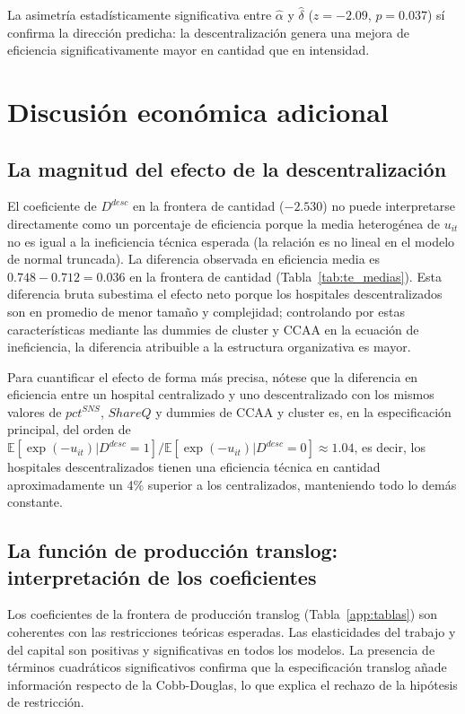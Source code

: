 \documentclass[12pt, a4paper, twoside, openright]{book}
\newcommand{\E}{\mathbb{E}}
\theoremstyle{plain}
\theoremstyle{definition}
\theoremstyle{remark}
\begin{document}
La asimetría estadísticamente significativa entre $\hat{\alpha}$ y $\hat{\delta}$ ($z=-2.09$, $p=0.037$) sí confirma la dirección predicha: la descentralización genera una mejora de eficiencia significativamente mayor en cantidad que en intensidad.

\section{Discusión económica adicional}
\label{sec:discusion_economica}

\subsection{La magnitud del efecto de la descentralización}

El coeficiente de $D^{desc}$ en la frontera de cantidad ($-2.530$) no puede interpretarse directamente como un porcentaje de eficiencia porque la media heterogénea de $u_{it}$ no es igual a la ineficiencia técnica esperada (la relación es no lineal en el modelo de normal truncada). La diferencia observada en eficiencia media es $0.748 - 0.712 = 0.036$ en la frontera de cantidad (Tabla~\ref{tab:te_medias}). Esta diferencia bruta subestima el efecto neto porque los hospitales descentralizados son en promedio de menor tamaño y complejidad; controlando por estas características mediante las dummies de cluster y CCAA en la ecuación de ineficiencia, la diferencia atribuible a la estructura organizativa es mayor.

Para cuantificar el efecto de forma más precisa, nótese que la diferencia en eficiencia entre un hospital centralizado y uno descentralizado con los mismos valores de $pct^{SNS}$, $ShareQ$ y dummies de CCAA y cluster es, en la especificación principal, del orden de $\E[\exp(-u_{it})|D^{desc}=1] / \E[\exp(-u_{it})|D^{desc}=0] \approx 1.04$, es decir, los hospitales descentralizados tienen una eficiencia técnica en cantidad aproximadamente un 4\% superior a los centralizados, manteniendo todo lo demás constante.

\subsection{La función de producción translog: interpretación de los coeficientes}

Los coeficientes de la frontera de producción translog (Tabla~\ref{app:tablas}) son coherentes con las restricciones teóricas esperadas. Las elasticidades del trabajo y del capital son positivas y significativas en todos los modelos. La presencia de términos cuadráticos significativos confirma que la especificación translog añade información respecto de la Cobb-Douglas, lo que explica el rechazo de la hipótesis de restricción.
\end{document}
